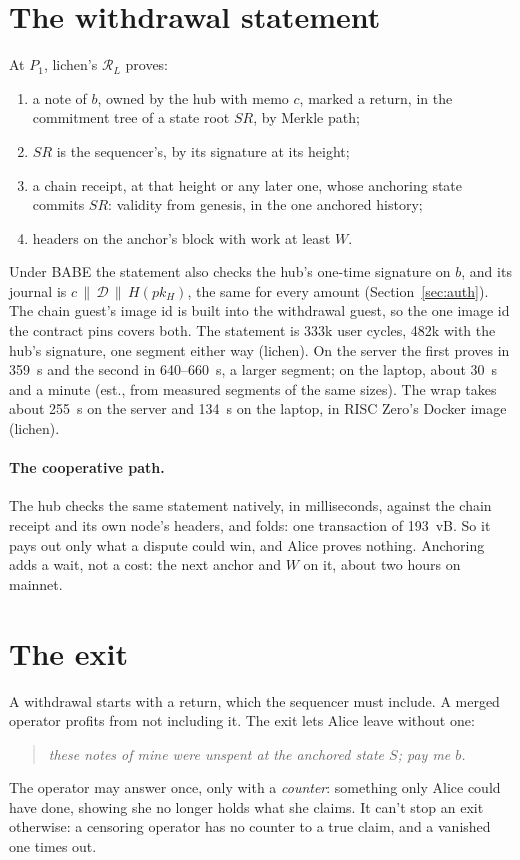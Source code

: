 \documentclass[11pt]{article}
\begin{document}
\section{The withdrawal statement}
\label{sec:withdrawal}

At $P_1$, lichen's $\mathcal{R}_L$ proves:
\begin{enumerate}[leftmargin=1.5em]
\item a note of $b$, owned by the hub with memo $c$, marked a return, in
  the commitment tree of a state root $\mathit{SR}$, by Merkle path;
\item $\mathit{SR}$ is the sequencer's, by its signature at its height;
\item a chain receipt, at that height or any later one, whose anchoring
  state commits $\mathit{SR}$: validity from genesis, in the one anchored
  history;
\item headers on the anchor's block with work at least $W$.
\end{enumerate}
Under BABE the statement also checks the hub's one-time signature on
$b$, and its journal is $c \,\|\, \mathcal{D} \,\|\, H(pk_H)$, the same for every
amount (Section~\ref{sec:auth}). The chain guest's image id is built
into the withdrawal guest, so the one image id the contract pins covers
both. The statement is 333k user cycles, 482k with the hub's signature,
one segment either way (lichen). On the server the first proves in
359~s and the second in 640--660~s, a larger segment; on the laptop,
about 30~s and a minute (est., from measured segments of the same
sizes). The wrap takes about 255~s on the server and 134~s on the
laptop, in RISC Zero's Docker image (lichen).

\paragraph{The cooperative path.} The hub checks the same statement
natively, in milliseconds, against the chain receipt and its own node's
headers, and folds: one transaction of 193~vB. So it pays out only what
a dispute could win, and Alice proves nothing. Anchoring adds a wait,
not a cost: the next anchor and $W$ on it, about two hours on mainnet.

\section{The exit}
\label{sec:exit}

A withdrawal starts with a return, which the sequencer must include. A
merged operator profits from not including it. The exit lets Alice leave
without one:
\begin{quote}
\emph{these notes of mine were unspent at the anchored state $S$; pay me
$b$.}
\end{quote}
The operator may answer once, only with a \emph{counter}: something only
Alice could have done, showing she no longer holds what she claims. It
can't stop an exit otherwise: a censoring operator has no counter to a
true claim, and a vanished one times out.
\end{document}
